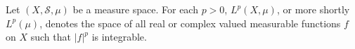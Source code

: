 Let $(X, \mathcal{S}, \mu)$ be a measure space. For each $p > 0$, $L^p(X, \mu)$, or more shortly $L^p(\mu)$, denotes the space of all real or complex valued measurable functions $f$ on $X$ such that $|f|^p$ is integrable.
